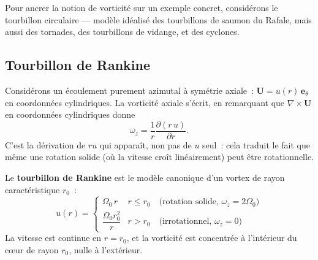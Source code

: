 \documentclass[11pt,a4paper]{report}
\newcommand{\pd}[2]{\dfrac{\partial #1}{\partial #2}}
\begin{document}
Pour ancrer la notion de vorticit\'e sur un exemple concret, consid\'erons le tourbillon
circulaire --- mod\`ele id\'ealis\'e des tourbillons de saumon du Rafale, mais aussi
des tornades, des tourbillons de vidange, et des cyclones.

\subsection{Tourbillon de Rankine}

Consid\'erons un \'ecoulement purement azimutal \`a sym\'etrie axiale~:
$\bm{U} = u(r)\,\bm{e}_\theta$ en coordonn\'ees cylindriques. La vorticit\'e
axiale s'\'ecrit, en remarquant que $\nabla\times\bm{U}$ en coordonn\'ees cylindriques
donne
\[
  \omega_z = \frac{1}{r}\pd{(r\,u)}{r}.
\]
C'est la d\'erivation de $ru$ qui appara\^it, non pas de $u$ seul~: cela traduit le fait que
m\^eme une rotation solide (o\`u la vitesse cro\^it lin\'eairement) peut \^etre rotationnelle.

Le \textbf{tourbillon de Rankine} est le mod\`ele canonique d'un vortex de rayon caract\'eristique
$r_0$~:
\[
  u(r) = \begin{cases} \Omega_0\, r & r \le r_0 \quad \text{(rotation solide, }
  \omega_z = 2\Omega_0\text{)} \\ \dfrac{\Omega_0 r_0^2}{r} & r > r_0 \quad
  \text{(irrotationnel, } \omega_z = 0\text{)} \end{cases}
\]
La vitesse est continue en $r = r_0$, et la vorticit\'e est concentr\'ee \`a l'int\'erieur
du c\oe ur de rayon $r_0$, nulle \`a l'ext\'erieur.

\begin{center}
\end{center}
\end{document}
